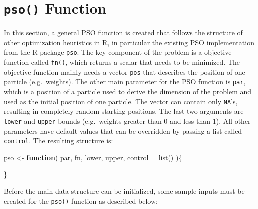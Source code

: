 \documentclass[
  oneside]{book}
\newenvironment{Shaded}{\begin{snugshade}}{\end{snugshade}}
\newcommand{\AttributeTok}[1]{\textcolor[rgb]{0.77,0.63,0.00}{#1}}
\newcommand{\ControlFlowTok}[1]{\textcolor[rgb]{0.13,0.29,0.53}{\textbf{#1}}}
\newcommand{\FunctionTok}[1]{\textcolor[rgb]{0.00,0.00,0.00}{#1}}
\newcommand{\NormalTok}[1]{#1}
\newcommand{\OtherTok}[1]{\textcolor[rgb]{0.56,0.35,0.01}{#1}}
\begin{document}
\hypertarget{pso-function}{%
\section{\texorpdfstring{\texttt{pso()} Function}{pso() Function}}\label{pso-function}}

In this section, a general PSO function is created that follows the structure of other optimization heuristics in R, in particular the existing PSO implementation from the R package \texttt{pso}. The key component of the problem is a objective function called \texttt{fn()}, which returns a scalar that needs to be minimized. The objective function mainly needs a vector \texttt{pos} that describes the position of one particle (e.g.~weights). The other main parameter for the PSO function is \texttt{par}, which is a position of a particle used to derive the dimension of the problem and used as the initial position of one particle. The vector can contain only \texttt{NA}'s, resulting in completely random starting positions. The last two arguments are \texttt{lower} and \texttt{upper} bounds (e.g.~weights greater than 0 and less than 1). All other parameters have default values that can be overridden by passing a list called \texttt{control}. The resulting structure is:

\begin{Shaded}
\begin{Highlighting}[]
\NormalTok{pso }\OtherTok{\textless{}{-}} \ControlFlowTok{function}\NormalTok{(}
\NormalTok{    par, }
\NormalTok{    fn, }
\NormalTok{    lower, }
\NormalTok{    upper, }
    \AttributeTok{control =} \FunctionTok{list}\NormalTok{()}
\NormalTok{  )\{}

\NormalTok{\}}
\end{Highlighting}
\end{Shaded}

Before the main data structure can be initialized, some sample inputs must be created for the \texttt{pso()} function as described below:
\end{document}
